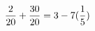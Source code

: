 \documentclass[preview]{standalone}
\begin{document}
\begin{align*}
\special{dvisvgm:raw <g id='unique000'>}\frac{2}{20} + \frac{30}{20} = 3 - 7(\frac{1}{5})\special{dvisvgm:raw </g>}
\end{align*}
\end{document}
